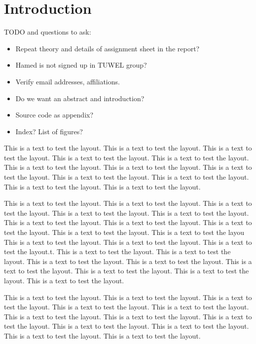 \documentclass[a4paper,psfig,subfigure,epsfig,fleqn,ausarbeitung,amssmb,float,caption,fontenc]{article}
\begin{document}
\section{Introduction}
\label{sec:introduction}


TODO and questions to ask:
\begin{itemize}[noitemsep]
\item Repeat theory and details of assignment sheet in the report?
\item Hamed is not signed up in TUWEL group?
\item Verify email addresses, affiliations.
\item Do we want an abstract and introduction?
\item Source code as appendix?
\item Index? List of figures?
\end{itemize}


This is a text to test the layout. This is a text to test the layout.
This is a text to test the layout.  This is a text to test the layout.
This is a text to test the layout. This is a text to test the layout.
This is a text to test the layout. This is a text to test the layout.
This is a text to test the layout.  This is a text to test the layout.
This is a text to test the layout. This is a text to test the layout.



This is a text to test the layout. This is a text to test the layout.
This is a text to test the layout.  This is a text to test the layout.
This is a text to test the layout. This is a text to test the layout.
This is a text to test the layout. This is a text to test the layout.
This is a text to test the layout.  This is a text to test the layou
This is a text to test the layout. This is a text to test the layout.
This is a text to test the layout.t. This is a text to test the
layout. This is a text to test the layout.  This is a text to test the
layout. This is a text to test the layout. This is a text to test the
layout.  This is a text to test the layout. This is a text to test the
layout. This is a text to test the layout.



This is a text to test the layout. This is a text to test the layout.
This is a text to test the layout.  This is a text to test the layout.
This is a text to test the layout. This is a text to test the layout.
This is a text to test the layout. This is a text to test the layout.
This is a text to test the layout.  This is a text to test the layout.
This is a text to test the layout. This is a text to test the layout.
\end{document}
